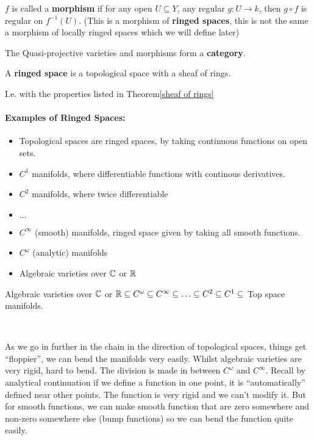 \begin{definition}
    $f$ is called a \textbf{morphism} if for any open $U\subseteq Y$, any regular $g\colon U\rightarrow k$, then $g\circ f$ is regular on $f^{-1}(U)$. (This is a morphism of \textbf{ringed spaces}, this is not the same a morphism of locally ringed spaces which we will define later)

    The Quasi-projective varieties and morphisms form a \textbf{category}. 
\end{definition}

\begin{definition}
    A \textbf{ringed space} is a topological space with a sheaf of rings. 
    
    I.e. with the properties listed in Theorem\ref{sheaf of rings} 
\end{definition}

\paragraph*{Examples of Ringed Spaces:}

\begin{itemize}
    \item Topological spaces are ringed spaces, by taking continuous functions on open sets.
    \item $C^1$ manifolds, where differentiable functions with continous derivatives.
    \item $C^2$ manifolds, where twice differentiable
    \item $\ldots$
    \item $C^\infty$ (smooth) manifolds, ringed space given by taking all smooth functions.
    \item $C^\omega$ (analytic) manifolds
    \item Algebraic varieties over $\mathbb{C}$ or $\mathbb{R}$
\end{itemize}

Algebraic varieties over $\mathbb{C}$ or $\mathbb{R} \subseteq C^\omega \subseteq C^\infty\subseteq \ldots \subseteq C^2\subseteq C^1\subseteq $ Top space manifolds.  

\

As we go in further in the chain in the direction of topological spaces, things get ``floppier'', we can bend the manifolds very easily. Whilst algebraic varieties are very rigid, hard to bend. The division is made in between $C^\omega$ and $C^\infty$. Recall by analytical continuation if we define a function in one point, it is ``automatically'' defined near other points.
The function is very rigid and we can't modify it. But for smooth functions, we can make smooth function that are zero somewhere and non-zero somewhere else (bump functions) so we can bend the function quite easily.


